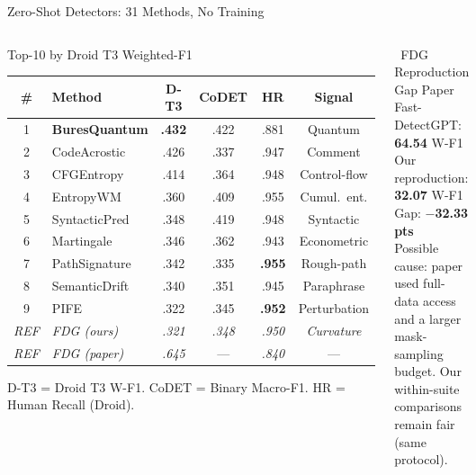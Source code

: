 \documentclass[aspectratio=169, 10pt]{beamer}
\begin{document}
\begin{frame}{Zero-Shot Detectors: 31 Methods, No Training}
\vspace{-0.25cm}
\begin{columns}[T]
\begin{block}{Top-10 by Droid T3 Weighted-F1}
\centering\scriptsize
\begin{tabular}{clcccc}
\toprule
\textbf{\#} & \textbf{Method} & \textbf{D-T3} & \textbf{CoDET} & \textbf{HR} & \textbf{Signal} \\
\midrule
\rowcolor{oursgreen}
1 & \textbf{BuresQuantum} & \textbf{.432} & .422 & .881 & Quantum \\
2 & CodeAcrostic & .426 & .337 & .947 & Comment \\
3 & CFGEntropy & .414 & .364 & .948 & Control-flow \\
4 & EntropyWM & .360 & .409 & .955 & Cumul.\ ent. \\
5 & SyntacticPred & .348 & .419 & .948 & Syntactic \\
6 & Martingale & .346 & .362 & .943 & Econometric \\
7 & PathSignature & .342 & .335 & \textbf{.955} & Rough-path \\
8 & SemanticDrift & .340 & .351 & .945 & Paraphrase \\
9 & PIFE & .322 & .345 & \textbf{.952} & Perturbation \\
\midrule
\textit{REF} & \textit{FDG (ours)} & \textit{.321} & \textit{.348} & \textit{.950} & \textit{Curvature} \\
\textit{REF} & \textit{FDG (paper)} & \textit{.645} & --- & \textit{.840} & --- \\
\bottomrule
\end{tabular}

{\tiny D-T3 = Droid T3 W-F1. CoDET = Binary Macro-F1. HR = Human Recall (Droid).}
\end{block}

\begin{alertblock}{\faExclamationTriangle\ FDG Reproduction Gap}
\small
Paper Fast-DetectGPT: \textbf{64.54} W-F1\\
Our reproduction: \textbf{32.07} W-F1\\
Gap: \textbf{$-$32.33 pts}\\[4pt]
{\scriptsize Possible cause: paper used full-data access and a larger mask-sampling budget. Our within-suite comparisons remain fair (same protocol).}
\end{alertblock}


\end{columns}
\end{frame}
\end{document}
